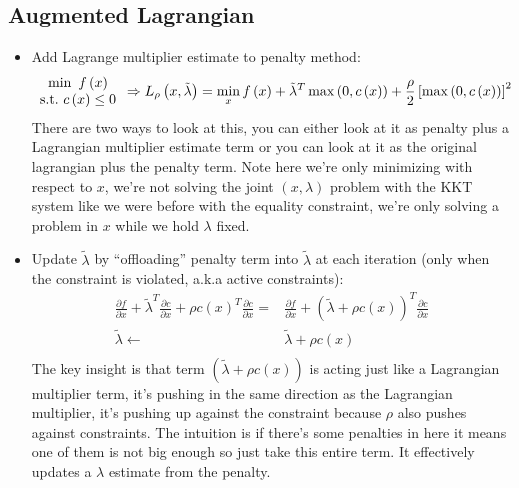 \subsection{Augmented Lagrangian}
\begin{itemize}
    \item Add Lagrange multiplier estimate to penalty method:
    \begin{equation}
        \begin{array}{c}
            \min\text{\,\,}f\left( x \right)\\
            \text{s.t.\,\,}c\left( x \right) \le 0\\
        \end{array}\Rightarrow L_{\rho}\left( x,\tilde{\lambda} \right) =\min_xf\left( x \right) +\tilde{\lambda}^T\max\left( 0,c\left( x \right) \right) +\frac{\rho}{2}\left[ \max \left( 0,c\left( x \right) \right) \right] ^2
    \end{equation}
    There are two ways to look at this, you can either look at it as penalty plus a Lagrangian multiplier estimate term or you can look at it as the original lagrangian plus the penalty term. Note here we're only minimizing with respect to $x$, we're not solving the joint $(x, \lambda)$ problem with the KKT system like we were before with the equality constraint, we're only solving a problem in $x$ while we hold $\lambda$ fixed.
    \item Update $\tilde{\lambda}$ by ``offloading'' penalty term into $\tilde{\lambda}$ at each iteration (only when the constraint is violated, a.k.a active constraints):
    \begin{equation}
        \begin{aligned}
            \frac{\partial f}{\partial x}+\tilde{\lambda}^T\frac{\partial c}{\partial x}+\rho c\left( x \right) ^T\frac{\partial c}{\partial x}=&\frac{\partial f}{\partial x}+\left( \tilde{\lambda}+\rho c\left( x \right) \right) ^T\frac{\partial c}{\partial x}\\
            \tilde{\lambda}\gets& \tilde{\lambda}+\rho c\left( x \right)\\
        \end{aligned}
    \end{equation}
    The key insight is that term $\left( \tilde{\lambda}+\rho c\left( x \right) \right)$ is acting just like a Lagrangian multiplier term, it's pushing in the same direction as the Lagrangian multiplier, it's pushing up against the constraint because $\rho$ also pushes against constraints. The intuition is if there's some penalties in here it means one of them is not big enough so just take this entire term. It effectively updates a $\lambda$ estimate from the penalty.

\end{itemize}
